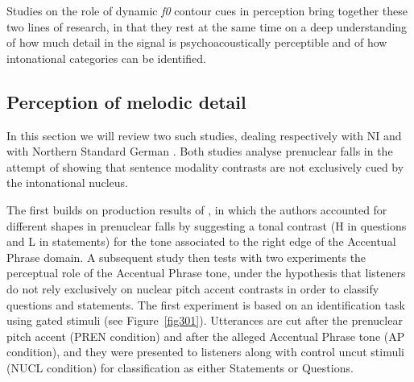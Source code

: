 Studies on the role of dynamic \textit{f0} contour cues in perception bring together these two lines of research, in that they rest at the same time on a deep understanding of how much detail in the signal is psychoacoustically perceptible and of how intonational categories can be identified.

\subsection{Perception of melodic detail}\label{sec311}
In this section we will review two such studies, dealing respectively with NI \citep{petrone2011tones} and with Northern Standard German \citep{petrone2014intonation}. Both studies analyse prenuclear falls in the attempt of showing that sentence modality contrasts are not exclusively cued by the intonational nucleus. 

The first builds on production results of \citet[see Section~\ref{sec241}]{petrone2008tonal}, in which the authors accounted for different shapes in prenuclear falls by suggesting a tonal contrast (H in questions and L in statements) for the tone associated to the right edge of the Accentual Phrase domain. A subsequent study \citep{petrone2011tones} then tests with two experiments the perceptual role of the Accentual Phrase tone, under the hypothesis that listeners do not rely exclusively on nuclear pitch accent contrasts in order to classify questions and statements. The first experiment is based on an identification task using gated stimuli (see Figure~\ref{fig301}). Utterances are cut after the prenuclear pitch accent (PREN condition) and after the alleged Accentual Phrase tone (AP condition), and they were presented to listeners along with control uncut stimuli (NUCL condition) for classification as either Statements or Questions. 

